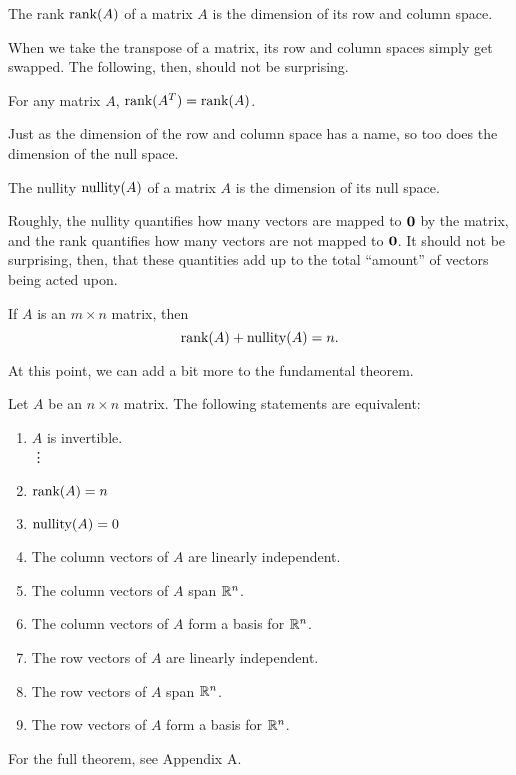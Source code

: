 \documentclass[../m073main.tex]{subfiles}
\begin{document}
\begin{definition}[Rank]
	The rank $\textrm{rank}(A)$ of a matrix $A$ is the dimension of its row and column space.
\end{definition}

When we take the transpose of a matrix, its row and column spaces simply get swapped.
The following, then, should not be surprising.

\begin{theorem}
	For any matrix $A$, $\textrm{rank}(A^T) = \textrm{rank}(A)$.
\end{theorem}

Just as the dimension of the row and column space has a name, so too does the dimension of the null space.

\begin{definition}[Nullity]
	The nullity $\textrm{nullity}(A)$ of a matrix $A$ is the dimension of its null space.
\end{definition}

Roughly, the nullity quantifies how many vectors are mapped to $\mathbf{0}$ by the matrix, and the rank quantifies how many vectors are not mapped to $\mathbf{0}$.
It should not be surprising, then, that these quantities add up to the total ``amount'' of vectors being acted upon.

\begin{theorem}
	If $A$ is an $m\times n$ matrix, then
	\[ \textrm{rank}(A) + \textrm{nullity}(A) = n. \]
\end{theorem}

At this point, we can add a bit more to the fundamental theorem.

\begin{theorem}
	Let $A$ be an $n\times n$ matrix.
	The following statements are equivalent:
	\begin{enumerate}[label=(\alph*)]
		\item $A$ is invertible. \\
		\phantom{~}\hspace{-19.5pt} \vdots
		\setcounter{enumi}{5}		
		\item $\textrm{rank}(A) = n$
		\item $\textrm{nullity}(A) = 0$
		\item The column vectors of $A$ are linearly independent.
		\item The column vectors of $A$ span $\mathbb{R}^n$.
		\item The column vectors of $A$ form a basis for $\mathbb{R}^n$.
		\item The row vectors of $A$ are linearly independent.
		\item The row vectors of $A$ span $\mathbb{R}^n$.
		\item The row vectors of $A$ form a basis for $\mathbb{R}^n$.
	\end{enumerate}
	For the full theorem, see Appendix A.
\end{theorem}
\end{document}
